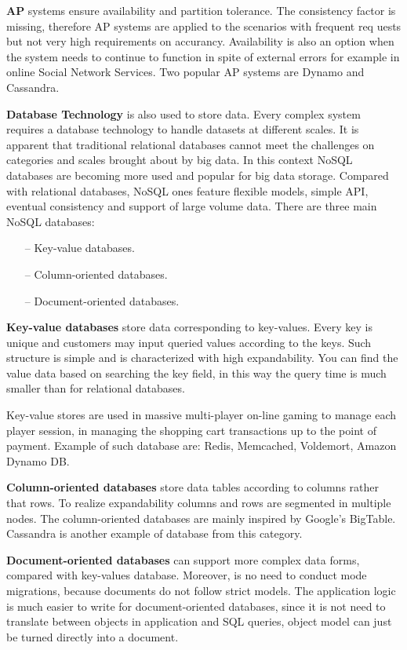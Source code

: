 \textbf{AP} systems ensure availability and partition tolerance. The consistency factor is missing, therefore AP systems are applied to the scenarios with frequent req
uests but not very high requirements on accurancy. Availability is also an option when the system needs to continue to function in spite of external errors\cite{AP} for example in online Social Network Services. Two popular AP systems are Dynamo and Cassandra. 

\textbf{Database Technology} is also used to store data. Every complex system requires a database technology to handle datasets at different scales. It is apparent that traditional relational databases cannot meet the challenges on categories and scales brought about by big data. In this context NoSQL databases are becoming more used and popular for big data storage. Compared with relational databases, NoSQL ones feature flexible models, simple API, eventual consistency and support of large volume data. There are three main NoSQL databases:
 
\begin{itemize}
\item[--] Key-value databases.
\item[--] Column-oriented databases.
\item[--] Document-oriented databases.
\end{itemize} 

\textbf{Key-value databases} store data corresponding to key-values. Every key is unique and customers may input queried values according to the keys. Such structure is simple and is characterized with high expandability. You can find the value data based on searching the key field, in this way the query time is much smaller than for relational databases.

Key-value stores are used in massive multi-player on-line gaming to manage each player session, in managing the shopping cart transactions up to the point of payment. Example of such database are: Redis, Memcached, Voldemort, Amazon Dynamo DB.

\textbf{Column-oriented databases} store data tables according to columns rather that rows. To realize expandability columns and rows are segmented in multiple nodes. The column-oriented databases are mainly inspired by Google's BigTable. Cassandra is another example of database from this category.

\textbf{Document-oriented databases} can support more complex data forms, compared with key-values database. Moreover, is no need to conduct mode migrations, because documents do not follow strict models. The application logic is much easier to write for document-oriented databases, since it is not need to translate between objects in application and SQL queries, object model can just be turned directly into a document.

